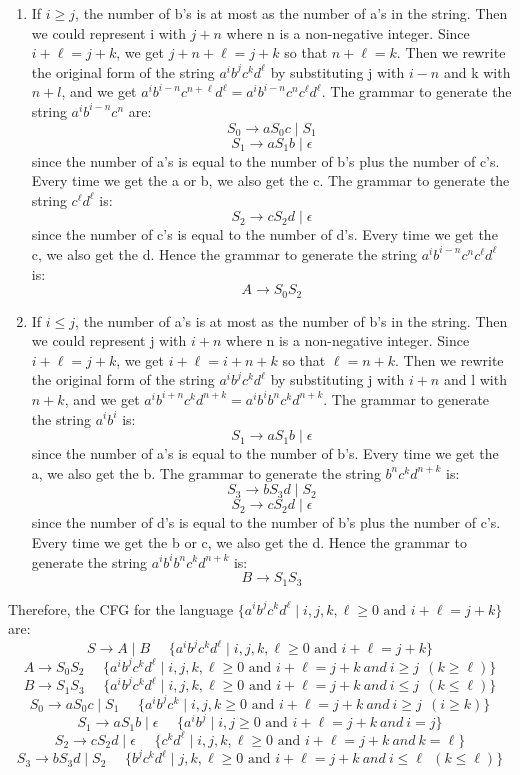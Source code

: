 \documentclass[11pt]{article}
\begin{document}
\begin{solution}
\begin{enumerate}
\begin{enumerate}[(1)]
\item If $i \geq j$, the number of b's is at most as the number of a's in the string. Then we could represent i with $j + n$ where n is a non-negative integer.
Since $i + \ell = j + k$, we get $j + n + \ell = j + k$ so that $n + \ell = k$. Then we rewrite the original form of the string $a^ib^jc^kd^\ell$ by substituting j with $i-n$ and k with $n+l$,
and we get $a^ib^{i-n}c^{n+\ell}d^\ell = a^ib^{i-n}c^nc^\ell d^\ell$. The grammar to generate the string $a^ib^{i-n}c^n$ are:
$$S_0 \rightarrow aS_0c \mid S_1$$   
$$S_1 \rightarrow aS_1b \mid \epsilon$$
since the number of a’s is equal to the number of b’s plus the number of c’s. Every time we get the a or b, we also get the c. The grammar to generate the string $c^\ell d^\ell$ is:
$$S_2 \rightarrow cS_2d \mid \epsilon$$
since the number of c’s is equal to the number of d’s. Every time we get the c, we also get the d.
Hence the grammar to generate the string $a^ib^{i-n}c^nc^\ell d^\ell$ is:
$$A \rightarrow S_0S_2$$
\item If $i \le j$, the number of a's is at most as the number of b's in the string. Then we could represent j with $i + n$ where n is a non-negative integer.
Since $i + \ell = j + k$, we get $i + \ell = i + n + k$ so that $\ell = n + k$. Then we rewrite the original form of the string $a^ib^jc^kd^\ell$ by substituting j with $i+n$ and l with $n+k$,
and we get $a^ib^{i+n}c^kd^{n+k} = a^ib^ib^nc^kd^{n+k}$. The grammar to generate the string $a^ib^i$ is:
$$S_1 \rightarrow aS_1b \mid \epsilon$$
since the number of a’s is equal to the number of b’s. Every time we get the a, we also get the b. The grammar to generate the string $b^nc^kd^{n+k}$ is:
$$S_3 \rightarrow bS_3d \mid S_2$$
$$S_2 \rightarrow cS_2d \mid \epsilon$$
since the number of d's is equal to the number of b’s plus the number of c’s. Every time we get the b or c, we also get the d.
Hence the grammar to generate the string $a^ib^ib^nc^kd^{n+k}$ is:
$$B \rightarrow S_1S_3$$
\end{enumerate}
Therefore, the CFG for the language $\{a^ib^jc^kd^\ell \mid  i,j,k,\ell \ge 0 \mbox{~and~} i+\ell = j+k\}$ are:
$$S \rightarrow A \mid B {~ ~} {~ ~} {~ ~}  \{a^ib^jc^kd^\ell \mid  i,j,k,\ell \ge 0 \mbox{~and~} i+\ell = j+k\} $$ 
$$A \rightarrow S_0S_2  {~ ~} {~ ~} {~ ~} \{a^ib^jc^kd^\ell \mid  i,j,k,\ell \ge 0 \mbox{~and~} i+\ell = j+k{~and~} i \ge j {~ ~} (k \ge \ell)\} $$
$$B \rightarrow S_1S_3 {~ ~} {~ ~} {~ ~} \{a^ib^jc^kd^\ell \mid  i,j,k,\ell \ge 0 \mbox{~and~} i+\ell = j+k{~and~} i \le j {~ ~} (k \le \ell)\}$$
$$S_0 \rightarrow aS_0c \mid S_1 {~ ~} {~ ~} {~ ~} \{a^ib^jc^k \mid  i,j,k \ge 0 \mbox{~and~} i+\ell = j+k{~and~} i \ge j {~ ~} (i \ge k)\}$$
$$S_1 \rightarrow aS_1b \mid \epsilon {~ ~} {~ ~} {~ ~} \{a^ib^j\mid  i,j \ge 0 \mbox{~and~} i+\ell = j+k{~and~} i = j \}$$
$$S_2 \rightarrow cS_2d \mid \epsilon {~ ~} {~ ~} {~ ~} \{c^kd^\ell \mid  i,j,k,\ell \ge 0 \mbox{~and~} i+\ell = j+k{~and~} k = \ell \}$$
$$S_3 \rightarrow bS_3d \mid S_2 {~ ~} {~ ~} {~ ~} \{b^jc^kd^\ell \mid j,k,\ell \ge 0 \mbox{~and~} i+\ell = j+k{~and~} i \le \ell {~ ~} (k \le \ell)\}$$



\end{enumerate}
\end{solution}
\end{document}
